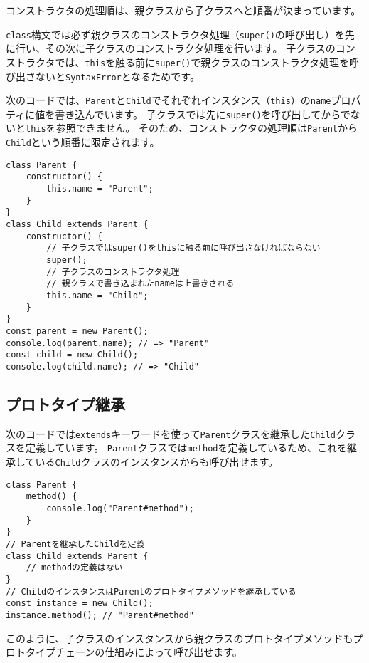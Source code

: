 コンストラクタの処理順は、親クラスから子クラスへと順番が決まっています。

\texttt{class}構文では必ず親クラスのコンストラクタ処理（\texttt{super()}の呼び出し）を先に行い、その次に子クラスのコンストラクタ処理を行います。
子クラスのコンストラクタでは、\texttt{this}を触る前に\texttt{super()}で親クラスのコンストラクタ処理を呼び出さないと\texttt{SyntaxError}となるためです。

次のコードでは、\texttt{Parent}と\texttt{Child}でそれぞれインスタンス（\texttt{this}）の\texttt{name}プロパティに値を書き込んでいます。
子クラスでは先に\texttt{super()}を呼び出してからでないと\texttt{this}を参照できません。
そのため、コンストラクタの処理順は\texttt{Parent}から\texttt{Child}という順番に限定されます。

\begin{lstlisting}
class Parent {
    constructor() {
        this.name = "Parent";
    }
}
class Child extends Parent {
    constructor() {
        // 子クラスではsuper()をthisに触る前に呼び出さなければならない
        super();
        // 子クラスのコンストラクタ処理
        // 親クラスで書き込まれたnameは上書きされる
        this.name = "Child";
    }
}
const parent = new Parent();
console.log(parent.name); // => "Parent"
const child = new Child();
console.log(child.name); // => "Child"
\end{lstlisting}

\hypertarget{prototype-inheritance}{%
\subsection{プロトタイプ継承}\label{prototype-inheritance}}

次のコードでは\texttt{extends}キーワードを使って\texttt{Parent}クラスを継承した\texttt{Child}クラスを定義しています。
\texttt{Parent}クラスでは\texttt{method}を定義しているため、これを継承している\texttt{Child}クラスのインスタンスからも呼び出せます。

\begin{lstlisting}
class Parent {
    method() {
        console.log("Parent#method");
    }
}
// Parentを継承したChildを定義
class Child extends Parent {
    // methodの定義はない
}
// ChildのインスタンスはParentのプロトタイプメソッドを継承している
const instance = new Child();
instance.method(); // "Parent#method"
\end{lstlisting}

このように、子クラスのインスタンスから親クラスのプロトタイプメソッドもプロトタイプチェーンの仕組みによって呼び出せます。

